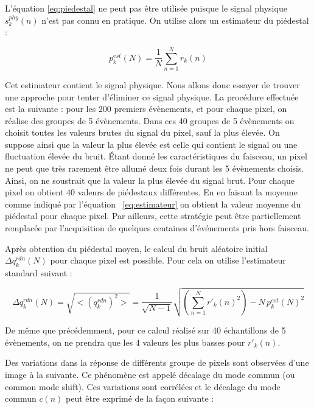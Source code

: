    L'\'equation \ref{eq:piedestal} ne peut pas \^etre utilis\'ee puisque le signal physique $s_k^{phy}(n)$ n'est pas connu en pratique. On utilise alors un estimateur du pi\'edestal : 
   
   \begin{equation}
     p_k^{est}(N)  = \dfrac{1}{N} \sum_{n=1}^N r_k(n)
     \label{eq:estimateur}
   \end{equation}
   
   Cet estimateur contient le signal physique. Nous allons donc essayer de trouver une approche pour tenter d'\'eliminer ce signal physique. La proc\'edure effectu\'ee est la suivante : pour les 200 premiers \'ev\`enements, et pour chaque pixel, on r\'ealise des groupes de 5 \'ev\`enements. Dans ces 40 groupes de 5 \'ev\`enements on choisit toutes les valeurs brutes du signal du pixel, sauf la plus \'elev\'ee. On suppose ainsi que la valeur la plus \'elev\'ee est celle qui contient le signal ou une fluctuation \'elev\'ee du bruit. \'Etant donn\'e les caract\'eristiques du faisceau, un pixel ne peut que tr\`es rarement \^etre allum\'e deux fois durant les 5 \'ev\`enements choisis. Ainsi, on ne soustrait que la valeur la plus \'elev\'ee du signal brut. Pour chaque pixel on obtient 40 valeurs de pi\'edestaux diff\'erentes. En en faisant la moyenne comme indiqu\'e par l'\'equation ~\ref{eq:estimateur}
   on obtient la valeur moyenne du pi\'edestal pour chaque pixel. Par ailleurs, cette strat\'egie peut \^etre partiellement remplac\'ee par l'acquisition de quelques centaines d'\'ev\'enements pris hors faisceau.
   
   \medskip
   
   Apr\`es obtention du pi\'edestal moyen, le calcul du bruit al\'eatoire initial $\Delta q_k^{rdn}(N)$ pour chaque pixel est possible. Pour cela on utilise l'estimateur standard suivant : 
   
   \begin{equation}
     \Delta q_k^{rdn}(N) = \sqrt{ <(q_k^{rdn})^2> } = \dfrac{1}{\sqrt{N-1}} \sqrt{ \left( \sum_{n=1}^N r'_k(n)^2 \right) - N \, p_k^{est}(N)^2 }
   \end{equation}

   De m\^eme que pr\'ec\'edemment, pour ce calcul r\'ealis\'e sur 40 \'echantillons de 5 \'ev\`enements, on ne prendra que les 4 valeurs les plus basses pour $r'_k(n)$.
   
   \medskip
   
   Des variations dans la r\'eponse de diff\'erents groupe de pixels sont observ\'ees d'une image \`a la suivante. Ce ph\'enom\`ene est appel\'e d\'ecalage du mode commun (ou common mode shift). Ces variations sont corr\'el\'ees et le d\'ecalage du mode commun $c(n)$ peut \^etre exprim\'e de la fa\c{c}on suivante :
   
